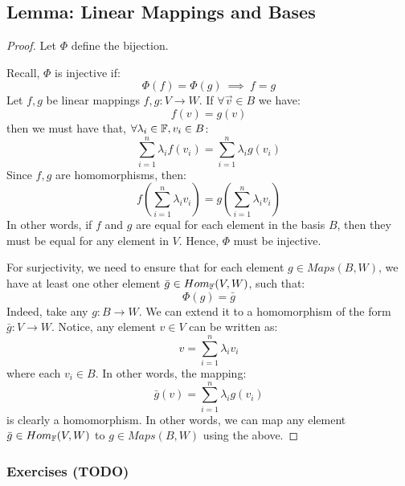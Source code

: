 \documentclass{exam}
\begin{document}
\subsection{Lemma: Linear Mappings and Bases}\label{l178}



\begin{proof}

Let $\Phi$ define the bijection.

\bigskip

Recall, $\Phi$ is injective if:
\[
\Phi(f) = \Phi(g) \ \implies \ f = g
\]
Let $f,g$ be linear mappings $f,g : V \to W$. If $\forall \vec{v} \in B$ we have:
\[
f(v) = g(v)
\]
then we must have that, $\forall \lambda_i \in \mathbb{F}, v_i \in B$:
\[
\sum_{i = 1}^n \lambda_i f(v_i) = \sum_{i = 1}^n \lambda_i g(v_i)
\]
Since $f,g$ are homomorphisms, then:
\[
f\left(\sum_{i = 1}^n \lambda_i v_i \right) = g\left(\sum_{i = 1}^n \lambda_i v_i \right)
\]
In other words, if $f$ and $g$ are equal for each element in the basis $B$, then they must be equal for any element in $V$. Hence, $\Phi$ must be injective.

\bigskip

For surjectivity, we need to ensure that for each element $g \in Maps(B,W)$, we have at least one other element $\bar{g} \in Hom_{\mathbb{F}}(V,W)$, such that:
\[
\Phi(g) = \bar{g}
\]
Indeed, take any $g : B \to W$. We can extend it to a homomorphism of the form $\bar{g} : V \to W$. Notice, any element $v \in V$ can be written as:
\[
v = \sum_{i = 1}^n \lambda_i v_i
\]
where each $v_i \in B$. In other words, the mapping:
\[
\bar{g}(v) = \sum_{i = 1}^n \lambda_i g(v_i)
\]
is clearly a homomorphism. In other words, we can map any element $\bar{g} \in Hom_{\mathbb{F}}(V,W)$ to $g \in Maps(B,W)$ using the above.

\end{proof}

\subsubsection{Exercises (TODO)}
\end{document}

